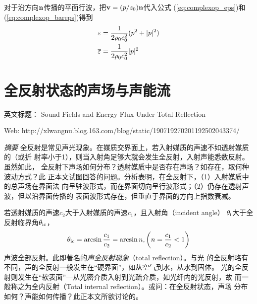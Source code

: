 \documentclass[UTF8]{ctexbook}
\let\stdsection\section
\renewcommand\section{\newpage\stdsection}
\begin{document}
对于沿方向$\vb{n}$传播的平面行波，把$\vb{v}=(p/z_0)\vb{n}$代入公式
(\ref{eq:complexop_eps})和(\ref{eq:complexop_bareps})得到
\begin{align*}
	\varepsilon &= \frac{1}{2\rho_0c_0^2} (p^2+|p|^2)\\
	\overline{\varepsilon} &= \frac{1}{2\rho_0c_0^2} |p|^2
\end{align*}


\section{全反射状态的声场与声能流}
英文标题：
Sound Fields and Energy Flux Under Total Reflection

Web:
http://xlwangnu.blog.163.com/blog/static/190719270201192502043374/

\emph{摘要}
全反射是常见声光现象。在媒质交界面上，若入射媒质的声速不如透射媒质的（或折
射率小于1），则当入射角足够大就会发生全反射，入射声能悉数反射。虽然如此，
全反射下声场如何分布？透射媒质中是否存在声场？如存在，取何种波动方式？此
正本文试图回答的问题。分析表明，在全反射下，（1）入射媒质中的总声场在界面法
向呈驻波形式，而在界面切向呈行波形式；（2）仍存在透射声波，但以沿界面传播的
表面波形式存在，但垂直于界面的方向上指数衰减。

若透射媒质的声速$c_2$大于入射媒质的声速$c_1$，且入射角（incident angle）
$\theta_\text{i}$大于全反射临界角$\theta_\text{ic}$，
\begin{equation}
\theta_\text{ic} = \arcsin \frac{c_1}{c_2} = \arcsin n, \qty(n=\frac{c_1}{c_2}
<1)
\end{equation}
声波全部反射。此即著名的\emph{声全反射现象}（total reflection）。与光
的全反射略有不同，声的全反射一般发生在“硬界面”，如从空气到水，从水到固体。
光的全反射则发生在“软表面”---从光密介质入射到光疏介质，如光纤内的光反射，故
而一般称之为全内反射（Total internal reflection）。或问：在全反射状态，声场
分布如何？声能如何传播？此正本文所欲讨论的。
\end{document}
